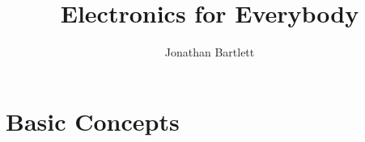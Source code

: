 \documentclass{book}
\begin{document}
\sloppy

\frontmatter

\title{Electronics for Everybody}
\author{Jonathan Bartlett}



\tableofcontents

\mainmatter




\part{Basic Concepts}











\appendix






\end{document}
